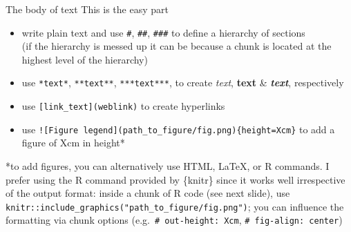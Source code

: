 \documentclass[
  ignorenonframetext,
  aspectratio=169,
  t]{beamer}
\providecommand{\tightlist}{%
  \setlength{\itemsep}{0pt}\setlength{\parskip}{0pt}}
\let\oldtexttt\texttt
\renewcommand{\texttt}[1]{\colorbox{gray!20}{\oldtexttt{#1}}}
\begin{document}
\begin{frame}[fragile]{The body of text}
\protect{}\label{the-body-of-text}
This is the easy part

\begin{itemize}
\tightlist
\item
  write plain text and use \texttt{\#}, \texttt{\#\#}, \texttt{\#\#\#}
  to define a hierarchy of sections\\
  (if the hierarchy is messed up it can be because a chunk is located at
  the highest level of the hierarchy)
\item
  use \texttt{*text*}, \texttt{**text**}, \texttt{***text***}, to create
  \emph{text}, \textbf{text} \& \textbf{\emph{text}}, respectively
\item
  use \texttt{{[}link\_text{]}(weblink)} to create hyperlinks
\item
  use
  \texttt{!{[}Figure\ legend{]}(path\_to\_figure/fig.png)\{height=Xcm\}}
  to add a figure of Xcm in height*
\end{itemize}

\vfill

\pause

*\footnotesize to add figures, you can alternatively use HTML, LaTeX, or
R commands. I prefer using the R command provided by \{knitr\} since it
works well irrespective of the output format: inside a chunk of R code
(see next slide), use
\texttt{knitr::include\_graphics("path\_to\_figure/fig.png")}; you can
influence the formatting via chunk options
(e.g.~\texttt{\#\textbar{}\ out-height:\ Xcm},
\texttt{\#\textbar{}\ fig-align:\ center})
\end{frame}
\end{document}
